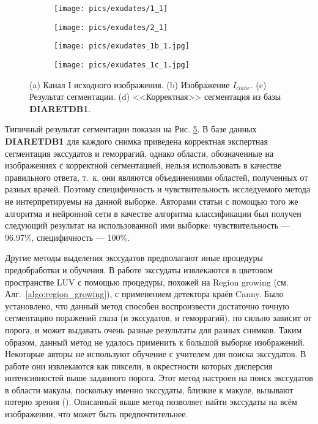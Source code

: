 \documentclass[12pt,fleqn]{article}
\begin{document}
\begin{figure}[h]
	\begin{subfigure}[b]{.45\textwidth}
		\texttt{[image: pics/exudates/1\_1]}
		\caption{}
		\label{fig:exudates1_1}
	\end{subfigure}
	\hfill
	\begin{subfigure}[b]{.45\textwidth}
		\texttt{[image: pics/exudates/2\_1]}
		\caption{}
		\label{fig:exudates_1a}
	\end{subfigure}
	
	\begin{subfigure}[b]{.45\textwidth}
		\texttt{[image: pics/exudates\_1b\_1.jpg]}
		\caption{}
		\label{fig:exudates_1b}
	\end{subfigure}
	\hfill
	\begin{subfigure}[b]{.45\textwidth}
		\texttt{[image: pics/exudates\_1c\_1.jpg]}
		\caption{}
		\label{fig:exudates_1c}
	\end{subfigure}
	\caption{(a) Канал I исходного изображения. (b) Изображение $I_{clahe}$. (c) Результат сегментации. (d) <<Корректная>> сегментация из базы \textbf{DIARETDB1}.}
	\label{fig:exudates_1}
\end{figure}

Типичный результат сегментации показан на Рис. \ref{fig:exudates_1}. В базе данных \textbf{DIARETDB1} для каждого снимка приведена корректная экспертная сегментация экссудатов и геморрагий, однако области, обозначенные на изображениях с корректной сегментацией, нельзя использовать в качестве правильного ответа, т.~к. они являются объединениями областей, полученных от разных врачей. Поэтому специфичность и чувствительность исследуемого метода не интерпретируемы на данной выборке. Авторами статьи \cite{karegowda} с помощью того же алгоритма и нейронной сети в качестве алгоритма классификации был получен следующий результат на использованной ими выборке: чувствительность --- 96.97\%, специфичность --- 100\%. 

Другие методы выделения экссудатов предполагают иные процедуры предобработки и обучения. В работе \cite{huiqi_li} экссудаты извлекаются в цветовом пространстве LUV с помощью процедуры, похожей на Region growing (см. Алг.~\ref{algo:region_growing}), с применением детектора краёв Canny. Было установлено, что данный метод способен воспроизвести достаточно точную сегментацию поражений глаза (и экссудатов, и геморрагий), но сильно зависит от порога, и может выдавать очень разные результаты для разных снимков. Таким образом, данный метод не удалось применить к большой выборке изображений. 
Некоторые авторы не используют обучение с учителем для поиска экссудатов. В работе \cite{chernomorets} они извлекаются как пиксели, в окрестности которых дисперсия интенсивностей выше заданного порога. Этот метод настроен на поиск экссудатов в области макулы, поскольку именно экссудаты, близкие к макуле, вызывают потерю зрения (\cite{medical_dr}). Описанный выше метод позволяет найти экссудаты на всём изображении, что может быть предпочтительнее.
\end{document}
